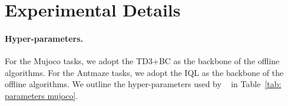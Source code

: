 


\clearpage
\section{Experimental Details}
\label{appendix: exp details}

\paragraph{Hyper-parameters.}
For the Mujoco tasks, we adopt the TD3+BC as the backbone of the offline algorithms.
For the Antmaze tasks, we adopt the IQL as the backbone of the offline algorithms.
We outline the hyper-parameters used by \name~ in Table~\ref{tab: parameters mujoco}.

